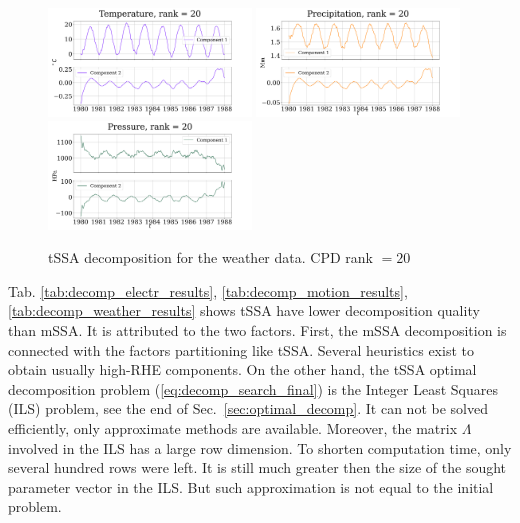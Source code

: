 \documentclass[referee, pdflatex, sn-mathphys-num]{sn-jnl}
\theoremstyle{definition}
\theoremstyle{plain}
\begin{document}
	\begin{figure}[h]
		\centering
		\includegraphics[width=0.48\textwidth, 	keepaspectratio]{Temperature_decomp.png}
		\includegraphics[width=0.48\textwidth, keepaspectratio]{Precipitation_decomp.png}
		\includegraphics[width=0.48\textwidth, keepaspectratio]{Pressure_decomp.png}
		\caption{tSSA decomposition for the weather data. CPD rank $ = 20 $}\label{fig:weather_decomp_tssa}
	\end{figure}
	
	Tab. \ref{tab:decomp_electr_results}, \ref{tab:decomp_motion_results}, \ref{tab:decomp_weather_results} shows tSSA have lower decomposition quality than mSSA. It is attributed to the two factors. First, the mSSA decomposition is connected with the factors partitioning like tSSA. Several heuristics exist to obtain usually high-RHE components. On the other hand, the tSSA optimal decomposition problem (\ref{eq:decomp_search_final}) is the Integer Least Squares (ILS) problem, see the end of Sec.~\ref{sec:optimal_decomp}. It can not be solved efficiently, only approximate methods are available. Moreover, the matrix $ \Lambda $ involved in the ILS has a large row dimension. To shorten computation time, only several hundred rows were left. It is still much greater then the size of the sought parameter vector in the ILS. But such approximation is not equal to the initial problem.
	
\end{document}
